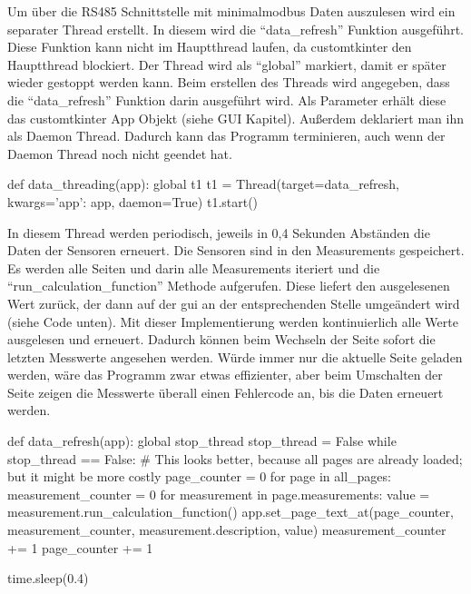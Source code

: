 \label{auslesen_rlt_parameter}

Um über die RS485 Schnittstelle mit minimalmodbus Daten auszulesen wird ein separater Thread erstellt. In diesem wird die \enquote{data\_refresh} Funktion ausgeführt. Diese Funktion kann nicht im Hauptthread laufen, da customtkinter den Hauptthread blockiert. Der Thread wird als \enquote{global} markiert, damit er später wieder gestoppt werden kann. Beim erstellen des Threads wird angegeben, dass die \enquote{data\_refresh} Funktion darin ausgeführt wird. Als Parameter erhält diese das customtkinter App Objekt (siehe GUI Kapitel). Außerdem deklariert man ihn als Daemon Thread. Dadurch kann das Programm terminieren, auch wenn der Daemon Thread noch nicht geendet hat.

\begin{pythoncode}
def data_threading(app):
	global t1
	t1 = Thread(target=data_refresh, kwargs={'app': app}, daemon=True)
	t1.start()
\end{pythoncode}

In diesem Thread werden periodisch, jeweils in 0,4 Sekunden Abständen die Daten der Sensoren erneuert. Die Sensoren sind in den Measurements gespeichert. Es werden alle Seiten und darin alle Measurements iteriert und die \enquote{run\_calculation\_function} Methode aufgerufen. Diese liefert den ausgelesenen Wert zurück, der dann auf der \acs{gui} an der entsprechenden Stelle umgeändert wird (siehe Code unten). \newline Mit dieser Implementierung werden kontinuierlich alle Werte ausgelesen und erneuert. Dadurch können beim Wechseln der Seite sofort die letzten Messwerte angesehen werden. Würde immer nur die aktuelle Seite geladen werden, wäre das Programm zwar etwas effizienter, aber beim Umschalten der Seite zeigen die Messwerte überall einen Fehlercode an, bis die Daten erneuert werden. 

\begin{pythoncode}
def data_refresh(app):
	global stop_thread
	stop_thread = False
	while stop_thread == False:
		# This looks better, because all pages are already loaded; but it might be more costly
		page_counter = 0
		for page in all_pages:
			measurement_counter = 0
			for measurement in page.measurements:
				value = measurement.run_calculation_function()
				app.set_page_text_at(page_counter, measurement_counter, measurement.description, value)
				measurement_counter += 1
			page_counter += 1
		
		time.sleep(0.4)
\end{pythoncode}

